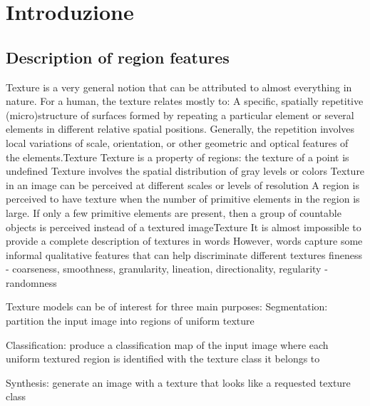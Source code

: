 \section{Introduzione}

\subsection{Description of region features}

Texture is a very general notion that can be
attributed to almost everything in nature.
For a human, the texture relates mostly to:
A specific, spatially repetitive (micro)structure of surfaces
formed by repeating a particular element or several
elements in different relative spatial positions.
Generally, the repetition involves local variations of scale,
orientation, or other geometric and optical features of the
elements.Texture
Texture is a property of regions: the texture of a
point is undefined
Texture involves the spatial distribution of gray
levels or colors
Texture in an image can be perceived at different
scales or levels of resolution
A region is perceived to have texture when the
number of primitive elements in the region is large. If
only a few primitive elements are present, then a
group of countable objects is perceived instead of a
textured imageTexture
It is almost impossible to provide a complete description of
textures in words
However, words capture some informal qualitative
features that can help
discriminate different
textures
fineness - coarseness,
smoothness,
granularity,
lineation,
directionality,
regularity - randomness


Texture models can be of interest for three
main purposes:
Segmentation: partition the input image
into regions of uniform texture


Classification: produce a classification map of the
input image where each uniform textured region
is identified with the texture class it belongs to


Synthesis: generate an image with a texture that
looks like a requested texture class